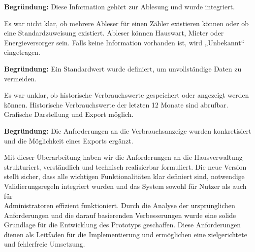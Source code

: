 \textbf{Begründung:}  
Diese Information gehört zur Ablesung und wurde integriert.

{Es war nicht klar, ob mehrere Ableser für einen Zähler existieren können oder ob eine Standardzuweisung existiert.}
{Ableser können Hauswart, Mieter oder Energieversorger sein. Falls keine Information vorhanden ist, wird „Unbekannt“ eingetragen.}

\textbf{Begründung:}  
Ein Standardwert wurde definiert, um unvollständige Daten zu vermeiden.

{Es war unklar, ob historische Verbrauchswerte gespeichert oder angezeigt werden können.}
{Historische Verbrauchswerte der letzten 12 Monate sind abrufbar. Grafische Darstellung und Export möglich.}

\textbf{Begründung:}  
Die Anforderungen an die Verbrauchsanzeige wurden konkretisiert und die Möglichkeit eines Exports ergänzt.


Mit dieser Überarbeitung haben wir die Anforderungen an die Hausverwaltung strukturiert, verständlich und technisch realisierbar formuliert.
Die neue Version stellt sicher, dass alle wichtigen Funktionalitäten klar definiert sind, notwendige Validierungsregeln integriert wurden und das System sowohl für Nutzer als auch für\\
Administratoren effizient funktioniert.
Durch die Analyse der ursprünglichen Anforderungen und die darauf basierenden Verbesserungen wurde eine solide Grundlage für die Entwicklung des Prototyps geschaffen.
Diese Anforderungen dienen als Leitfaden für die Implementierung und ermöglichen eine zielgerichtete und fehlerfreie Umsetzung.